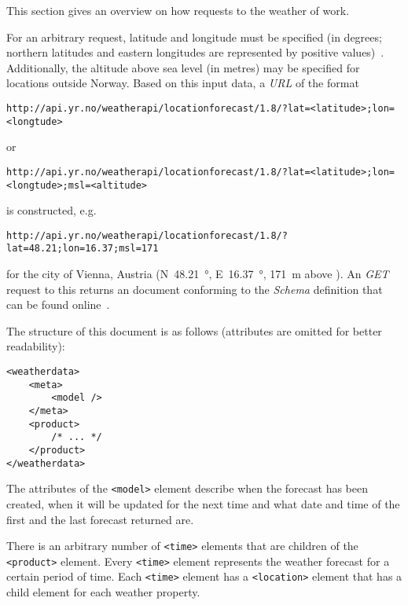 This section gives an overview on how requests to the weather  of \yrno work.

For an arbitrary request, latitude and longitude must be specified (in degrees; northern latitudes and eastern longitudes are represented by positive values)~\cite{yrno_documentation}. Additionally, the altitude above sea level (in metres) may be specified for locations outside Norway. Based on this input data, a \emph{URL} of the format

\begin{lstlisting}
http://api.yr.no/weatherapi/locationforecast/1.8/?lat=<latitude>;lon=<longtude>
\end{lstlisting}

or

\begin{lstlisting}
http://api.yr.no/weatherapi/locationforecast/1.8/?lat=<latitude>;lon=<longtude>;msl=<altitude>
\end{lstlisting}

is constructed, e.g.

\begin{lstlisting}
http://api.yr.no/weatherapi/locationforecast/1.8/?lat=48.21;lon=16.37;msl=171
\end{lstlisting}

for the city of Vienna, Austria (N~\SI {48.21}{\degree }, E~\SI {16.37}{\degree }, \SI {171}{\metre } above ). An  \emph{GET} request to this  returns an  document conforming to the  \emph{Schema}\cite{xml-schema} definition that can be found online~\cite{yrno_schema}.

The structure of this  document is as follows (attributes are omitted for better readability):

\begin{lstlisting}
<weatherdata>
	<meta>
		<model />
	</meta>
	<product>
		/* ... */
	</product>
</weatherdata>
\end{lstlisting}

The attributes of the \texttt{<model>} element describe when the forecast has been created, when it will be updated for the next time and what date and time of the first and the last forecast returned are.

There is an arbitrary number of \texttt{<time>} elements that are children of the \texttt{<product>} element. Every \texttt{<time>} element represents the weather forecast for a certain period of time. Each \texttt{<time>} element has a \texttt{<location>} element that has a child element for each weather property.

